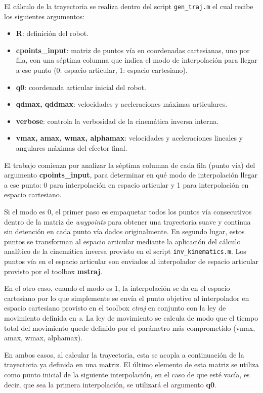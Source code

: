 \documentclass{article}
\begin{document}
El cálculo de la trayectoria se realiza dentro del script \colorbox{gray!20}{\texttt{gen\_traj.m}} el cual recibe los siguientes argumentos:
\begin{itemize}
    \item \textbf{R}: definición del robot.
    \item \textbf{cpoints\_input}: matriz de puntos vía en coordenadas cartesianas, uno por fila, con una séptima columna que indica el modo de interpolación para llegar a ese punto (0: espacio articular, 1: espacio cartesiano).
    \item \textbf{q0}: coordenada articular inicial del robot.
    \item \textbf{qdmax, qddmax}: velocidades y aceleraciones máximas articulares.
    \item \textbf{verbose}: controla la verbosidad de la cinemática inversa interna.
    \item \textbf{vmax, amax, wmax, alphamax}: velocidades y aceleraciones lineales y angulares máximas del efector final.
\end{itemize}

El trabajo comienza por analizar la séptima columna de cada fila (punto vía) del argumento \textbf{cpoints\_input}, para determinar en qué modo de interpolación llegar a ese punto: 0 para interpolación en espacio articular y 1 para interpolación en espacio cartesiano.

Si el modo es 0, el primer paso es empaquetar todos los puntos vía consecutivos dentro de la matriz de \textit{waypoints} para obtener una trayectoria suave y continua sin detención en cada punto vía dados originalmente. En segundo lugar, estos puntos se transforman al espacio articular mediante la aplicación del cálculo analítico de la cinemática inversa provisto en el script \colorbox{gray!20}{\texttt{inv\_kinematics.m}}. Los puntos vía en el espacio articular son enviados al interpolador de espacio articular provisto por el toolbox \textbf{mstraj}. 

En el otro caso, cuando el modo es 1, la interpolación se da en el espacio cartesiano por lo que simplemente se envía el punto objetivo al interpolador en espacio cartesiano provisto en el toolbox \textit{ctraj} en conjunto con la ley de movimiento definida en \textit{s}. La ley de movimiento se calcula de modo que el tiempo total del movimiento quede definido por el parámetro más comprometido (vmax, amax, wmax, alphamax). 

En ambos casos, al calcular la trayectoria, esta se acopla a continuación de la trayectoria ya definida en una matriz. El último elemento de esta matriz se utiliza como punto inicial de la siguiente interpolación, en el caso de que esté vacía, es decir, que sea la primera interpolación, se utilizará el argumento \textbf{q0}.
\end{document}
